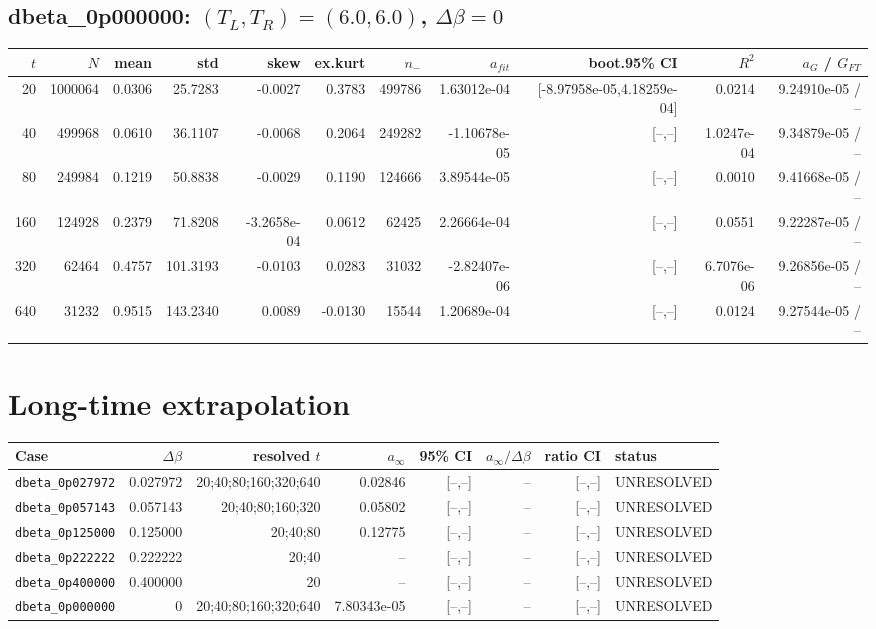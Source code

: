 \documentclass[10pt]{article}
\begin{document}
\subsection*{dbeta\_0p000000: $(T_L,T_R)=(6.0,6.0)$, $\Delta\beta=0$}
\scriptsize\begin{longtable}{rrrrrrrrrrr}
\toprule $t$ & $N$ & mean & std & skew & ex.kurt & $n_-$ & $a_{fit}$ & boot.95\% CI & $R^2$ & $a_G$ / $G_{FT}$ \\
\midrule\endhead
20 & 1000064 & 0.0306 & 25.7283 & -0.0027 & 0.3783 & 499786 & 1.63012e-04 & [-8.97958e-05,4.18259e-04] & 0.0214 & 9.24910e-05 / -- \\
40 & 499968 & 0.0610 & 36.1107 & -0.0068 & 0.2064 & 249282 & -1.10678e-05 & [--,--] & 1.0247e-04 & 9.34879e-05 / -- \\
80 & 249984 & 0.1219 & 50.8838 & -0.0029 & 0.1190 & 124666 & 3.89544e-05 & [--,--] & 0.0010 & 9.41668e-05 / -- \\
160 & 124928 & 0.2379 & 71.8208 & -3.2658e-04 & 0.0612 & 62425 & 2.26664e-04 & [--,--] & 0.0551 & 9.22287e-05 / -- \\
320 & 62464 & 0.4757 & 101.3193 & -0.0103 & 0.0283 & 31032 & -2.82407e-06 & [--,--] & 6.7076e-06 & 9.26856e-05 / -- \\
640 & 31232 & 0.9515 & 143.2340 & 0.0089 & -0.0130 & 15544 & 1.20689e-04 & [--,--] & 0.0124 & 9.27544e-05 / -- \\
\bottomrule\end{longtable}\normalsize
\section*{Long-time extrapolation}
\begin{longtable}{lrrrrrrl}
\toprule Case & $\Delta\beta$ & resolved $t$ & $a_\infty$ & 95\% CI & $a_\infty/\Delta\beta$ & ratio CI & status \\
\midrule\endhead
\texttt{dbeta\_0p027972} & 0.027972 & 20;40;80;160;320;640 & 0.02846 & [--,--] & -- & [--,--] & UNRESOLVED \\
\texttt{dbeta\_0p057143} & 0.057143 & 20;40;80;160;320 & 0.05802 & [--,--] & -- & [--,--] & UNRESOLVED \\
\texttt{dbeta\_0p125000} & 0.125000 & 20;40;80 & 0.12775 & [--,--] & -- & [--,--] & UNRESOLVED \\
\texttt{dbeta\_0p222222} & 0.222222 & 20;40 & -- & [--,--] & -- & [--,--] & UNRESOLVED \\
\texttt{dbeta\_0p400000} & 0.400000 & 20 & -- & [--,--] & -- & [--,--] & UNRESOLVED \\
\texttt{dbeta\_0p000000} & 0 & 20;40;80;160;320;640 & 7.80343e-05 & [--,--] & -- & [--,--] & UNRESOLVED \\
\bottomrule\end{longtable}
\end{document}
